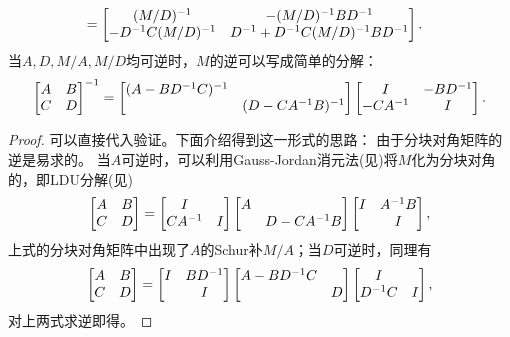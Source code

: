 \begin{theorem}
\begin{subequations}
\begin{align}
			&=\begin{bmatrix}
				(M/D)^{-1}&-(M/D)^{-1} BD^{-1}\\
				-D^{-1} C(M/D)^{-1}&D^{-1}+D^{-1} C(M/D)^{-1} BD^{-1}
			\end{bmatrix}.
		\end{align}
	\end{subequations}
	\tcblower 
	当$A,D,M/A,M/D$均可逆时，$M$的逆可以写成简单的分解：
	\begin{eqnarray}
		\begin{bmatrix}
			A&B\\C&D
		\end{bmatrix}^{-1}=\begin{bmatrix}
			(A-BD^{-1} C)^{-1}\\ &(D-CA^{-1} B)^{-1}
		\end{bmatrix}\begin{bmatrix}
			I&-BD^{-1}\\-CA^{-1}&I
		\end{bmatrix}.
	\end{eqnarray}
\end{theorem}

\begin{proof}
	可以直接代入验证。下面介绍得到这一形式的思路：
	由于分块对角矩阵的逆是易求的。
	当$A$可逆时，可以利用Gauss-Jordan消元法(见)将$M$化为分块对角的，即LDU分解(见)
	\[
		\begin{bmatrix}
			A&B\\C&D
		\end{bmatrix}=\begin{bmatrix}
			I\\CA^{-1}&I
		\end{bmatrix}\begin{bmatrix}
			A\\ &D-CA^{-1} B
		\end{bmatrix}\begin{bmatrix}
			I&A^{-1} B\\ &I
		\end{bmatrix},
	\]
	上式的分块对角矩阵中出现了$A$的Schur补$M/A$；当$D$可逆时，同理有
	\[
		\begin{bmatrix}
			A&B\\C&D
		\end{bmatrix}=\begin{bmatrix}
			I&BD^{-1}\\ &I
		\end{bmatrix}\begin{bmatrix}
			A-BD^{-1} C\\ &D
		\end{bmatrix}\begin{bmatrix}
			I\\D^{-1} C&I
		\end{bmatrix},
	\]
	对上两式求逆即得。
\end{proof}

